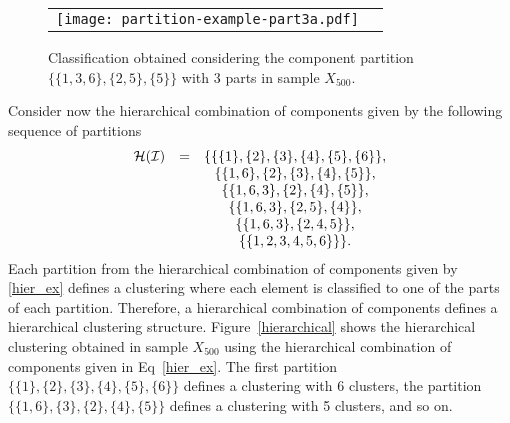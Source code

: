 \documentclass[10pt, a4paper]{article}
\begin{document}
\begin{figure}[!h]
\begin{center}
\begin{tabular}{cc}
  \texttt{[image: partition-example-part3a.pdf]} \\
 \end{tabular}
 \caption{Classification obtained considering the component partition $\{\{1, 3, 6 \}, \{2, 5\}, \{5\}\}$ with 3 parts in sample $X_{500}$.}\label{ex_part3a}
\end{center}
\end{figure}

Consider now the hierarchical combination of components given by the following sequence of partitions
\begin{equation}
\begin{array}{r c c}
\mathcal{H}(\mathcal{I}) &=& \{ \{\{1\},\{2\},\{3\},\{4\},\{5\},\{6\}\}, \\
   & & \{\{1, 6\},\{2\},\{3\},\{4\},\{5\} \}, \\
   & &    \{\{1, 6, 3\},\{2\},\{4\},\{5\} \}, \\
   & &    \{\{1, 6, 3\},\{2, 5\},\{4 \} \}, \\
    & &   \{\{1, 6, 3\},\{2, 4, 5\} \}, \\
   & &    \{\{1, 2, 3, 4, 5, 6\}\} \}.
\end{array}
\label{hier_ex}
\end{equation}
Each partition from the hierarchical combination of components given by \ref{hier_ex} defines a clustering where each element is classified to one of the parts of each partition. Therefore, a hierarchical combination of components defines a hierarchical clustering structure. Figure~\ref{hierarchical} shows the hierarchical clustering obtained in sample $X_{500}$ using the hierarchical combination of components given in Eq~\ref{hier_ex}. The first partition $\{\{1\},\{2\},\{3\},\{4\},\{5\},\{6\}\}$ defines a clustering with 6 clusters, the partition $\{\{1, 6\}, \{3\},\{2\},\{4\},\{5\} \}$ defines a clustering with 5 clusters, and so on.
\end{document}
